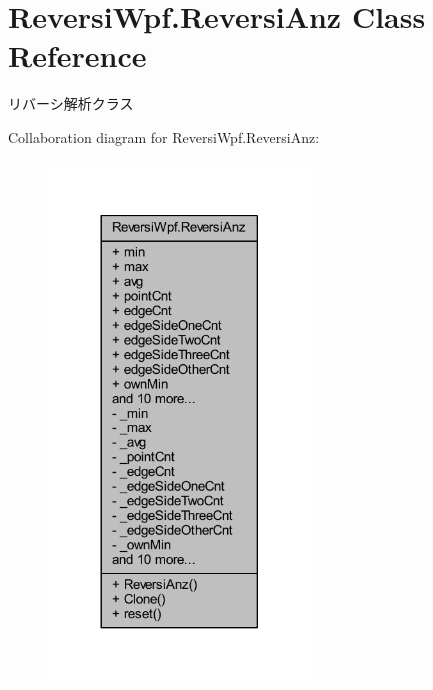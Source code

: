 \hypertarget{class_reversi_wpf_1_1_reversi_anz}{}\section{Reversi\+Wpf.\+Reversi\+Anz Class Reference}
\label{class_reversi_wpf_1_1_reversi_anz}


リバーシ解析クラス  




Collaboration diagram for Reversi\+Wpf.\+Reversi\+Anz\+:\nopagebreak
\begin{figure}[H]
\begin{center}
\leavevmode
\includegraphics[width=197pt]{class_reversi_wpf_1_1_reversi_anz__coll__graph}
\end{center}
\end{figure}
